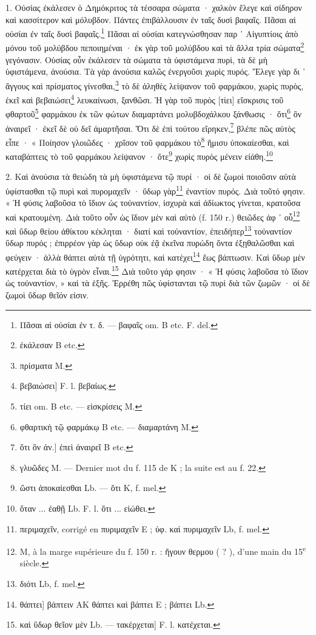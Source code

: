 \documentclass[a4paper, 11pt, oneside, polutonikogreek, french]{article}
\begin{document}
\bigskip

1. Οὐσίας ἐκάλεσεν ὁ Δημόκριτος τὰ τέσσαρα σώματα · χαλκὸν ἔλεγε καὶ σίδηρον καὶ κασσίτερον καὶ μόλυβδον. Πάντες ἐπιβάλλουσιν ἐν ταῖς δυσὶ βαφαῖς. Πᾶσαι αἱ οὐσίαι ἐν ταῖς δυσὶ βαφαῖς.\footnote{Πᾶσαι αἱ οὐσίαι ἐν τ. δ. --- βαφαῖς om. B etc. F. del.} Πᾶσαι αἱ οὐσίαι κατεγνώσθησαν παρ ᾽ Αἰγυπτίοις ἀπὸ μόνου τοῦ μολύβδου πεποιημέναι · ἐκ γὰρ τοῦ μολύβδου καὶ τὰ ἄλλα τρία σώματα\footnote{ἐκάλεσαν B etc.} γεγόνασιν. Οὐσίας οὖν ἐκάλεσεν τὰ σώματα τὰ ὑφιστάμενα πυρὶ, τὰ δὲ μὴ ὑφιστάμενα, ἀνούσια. Τὰ γὰρ ἀνούσια καλῶς ἐνεργοῦσι χωρὶς πυρός. Ἔλεγε γὰρ δι ᾽ ἄγγους καὶ πρίσματος γίνεσθαι,\footnote{πρίσματα M.} τὸ δὲ ἀληθὲς λείψανον τοῦ φαρμάκου, χωρὶς πυρὸς, ἐκεῖ καὶ βεβαιώσει\footnote{βεβαιώσει] F. l. βεβαίως.} λευκαίνωσι, ξανθῶσι. Ἡ γὰρ τοῦ πυρὸς [τίει] εἴσκρισις τοῦ φθαρτοῦ\footnote{τίει om. B etc. --- εἰσκρίσεις M.} φαρμάκου ἐκ τῶν φώτων διαμαρτάνει μολυβδοχάλκου ξάνθωσις · ὅτι\footnote{φθαρτικὴ τῷ φαρμάκῳ B etc. --- διαμαρτάνη M.} ὃν ἀναιρεῖ · ἐκεῖ δὲ οὐ δεῖ ἀμαρτῆσαι. Ὅτι δὲ ἐπὶ τούτου εἴρηκεν,\footnote{ὅτι ὃν ἀν.] ἐπεὶ ἀναιρεῖ B etc.} βλέπε πῶς αὐτὸς εἶπε · « Ποίησον γλοιῶδες · χρῖσον τοῦ φαρμάκου τὸ\footnote{γλυῶδες M. --- Dernier mot du f. 115 de K ; la suite est au f. 22.} ἥμισυ ὑποκαίεσθαι, καὶ καταβάπτεις τὸ τοῦ φαρμάκου λείψανον · ὅτε\footnote{ὥστι ἀποκαίεσθαι Lb. --- ὅτι K, f. mel.} χωρὶς πυρὸς μένειν εἰάθη.\footnote{ὅταν ... ἐαθῇ Lb. F. l. ὅτι ... εἰώθει.}

2. Καὶ ἀνούσια τὰ θειώδη τὰ μὴ ὑφιστάμενα τῷ πυρί · οἱ δὲ ζωμοὶ ποιοῦσιν αὐτὰ ὑφίστασθαι τῷ πυρὶ καὶ πυρομαχεῖν · ὕδωρ γὰρ\footnote{περιμαχεῖν, corrigé en πυριμαχεῖν E ; ὑφ. καὶ πυριμαχεῖν Lb, f. mel.} ἐναντίον πυρός. Διὰ τοῦτό φησιν. « Ἡ φύσις λαβοῦσα τὸ ἴδιον ὡς τοὐναντίον, ἰσχυρὰ καὶ ἀδίωκτος γίνεται, κρατοῦσα καὶ κρατουμένη. Διὰ τοῦτο οὖν ὡς ἴδιον μὲν καὶ αὐτὸ (f. 150 r.) θειῶδες ἀφ ᾽ οὗ\footnote{M, à la marge supérieure du f. 150 r. : ἤγουν θερμου ( ? ), d'une main du 15\textsuperscript{e} siècle.} καὶ ὕδωρ θείου ἀθίκτου κέκληται · διατί καὶ τοὐναντίον, ἐπειδήπερ\footnote{διότι Lb, f. mel.} τοὐναντίον ὕδωρ πυρός ; ἐπιρρέον γὰρ ὡς ὕδωρ οὐκ ἐᾷ ἐκεῖνα πυρώδη ὄντα ἐξῃθαλῶσθαι καὶ φεύγειν · ἀλλὰ θάπτει αὐτὰ τῇ ὑγρότητι, καὶ κατέχει\footnote{θάπτει] βάπτειν AK θάπτει καὶ βάπτει E ; βάπτει Lb.} ἕως βάπτωσιν. Καὶ ὕδωρ μὲν κατέρχεται διὰ τὸ ὑγρὸν εἶναι.\footnote{καὶ ὕδωρ θεῖον μὲν Lb. --- τακέρχεται] F. l. κατέχεται.} Διὰ τοῦτο γάρ φησιν · « Ἡ φύσις λαβοῦσα τὸ ἴδιον ὡς τοὐναντίον, » καὶ τὰ ἑξῆς. Ἐρρέθη πῶς ὑφίστανται τῷ πυρὶ διὰ τῶν ζωμῶν · οἱ δὲ ζωμοὶ ὕδωρ θεῖόν εἰσιν.

\bigskip
\centerline{\EightStarTaper}
\centerline{\EightStarTaper\EightStarTaper}
\bigskip
\end{document}
